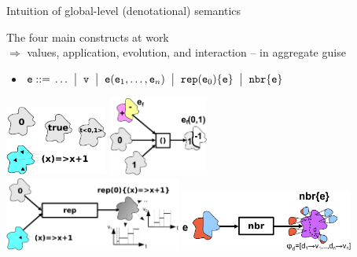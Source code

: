 \documentclass[presentation, 8pt]{beamer}\mode<presentation>{\usetheme{AMSBolognaFC}}
\begin{document}
\begin{frame}{Intuition of global-level (denotational) semantics}
	\begin{exampleblock}{The four main constructs at work\\ $\Rightarrow$ values, application, evolution, and interaction -- in aggregate guise}
	\begin{itemize}
		\item $\texttt{e} \;{\bf ::=}\; \ldots
   \; \;\bigr\rvert\; \; {\texttt{v}}
   \; \;\bigr\rvert\; \; {\texttt{e}} (\texttt{e}_1,\ldots,\texttt{e}_n)
   \;\;\bigr\rvert\; \; \texttt{rep}(\texttt{e}_0)\{\texttt{e}\}
   \; \;\bigr\rvert\; \; \texttt{nbr}\{\texttt{e}\}$
	\end{itemize}
	\end{exampleblock}
\begin{center}
\includegraphics[height=2.3cm]{img/ing-v.pdf}\hspace{30pt}
\includegraphics[height=2.57cm]{img/ing-mix5.pdf}\\[5pt]
\includegraphics[height=2.42cm]{img/ing-rep2.pdf}\hspace{10pt}
\includegraphics[height=1.96cm]{img/ing-nbr4.pdf}\end{center}
\end{frame}
\end{document}
